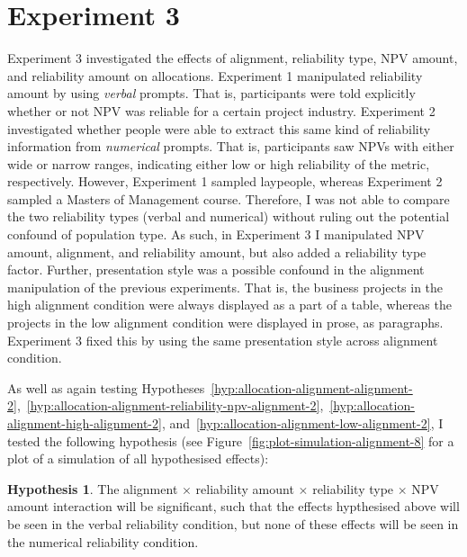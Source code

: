 \documentclass[a4paper, nobind, dvipsnames]{templates/ociamthesis}
\theoremstyle{definition}
\theoremstyle{definition}
\theoremstyle{definition}
\theoremstyle{definition}
\newtheorem{hypothesis}{Hypothesis}[chapter]
\theoremstyle{remark}
\begin{document}
\hypertarget{experiment-3}{%
\section{Experiment 3}\label{experiment-3}}

Experiment 3 investigated the effects of alignment, reliability type, NPV
amount, and reliability amount on allocations. Experiment 1 manipulated
reliability amount by using \emph{verbal} prompts. That is, participants were told
explicitly whether or not NPV was reliable for a certain project industry.
Experiment 2 investigated whether people were able to extract this same kind of
reliability information from \emph{numerical} prompts. That is, participants saw NPVs
with either wide or narrow ranges, indicating either low or high reliability of
the metric, respectively. However, Experiment 1 sampled laypeople, whereas
Experiment 2 sampled a Masters of Management course. Therefore, I was not able
to compare the two reliability types (verbal and numerical) without ruling out
the potential confound of population type. As such, in Experiment 3 I
manipulated NPV amount, alignment, and reliability amount, but also added a
reliability type factor. Further, presentation style was a possible confound in
the alignment manipulation of the previous experiments. That is, the business
projects in the high alignment condition were always displayed as a part of a
table, whereas the projects in the low alignment condition were displayed in
prose, as paragraphs. Experiment 3 fixed this by using the same presentation
style across alignment condition.

As well as again testing
Hypotheses~\ref{hyp:allocation-alignment-alignment-2},~\ref{hyp:allocation-alignment-reliability-npv-alignment-2},~\ref{hyp:allocation-alignment-high-alignment-2},
and~\ref{hyp:allocation-alignment-low-alignment-2}, I tested the following
hypothesis (see Figure~\ref{fig:plot-simulation-alignment-8} for a plot of a
simulation of all hypothesised effects):

\begin{hypothesis}
\protect\hypertarget{hyp:four-way-alignment-8}{}{\label{hyp:four-way-alignment-8} }The alignment \(\times\) reliability amount \(\times\) reliability type \(\times\) NPV
amount interaction will be significant, such that the effects hypthesised above
will be seen in the verbal reliability condition, but none of these effects
will be seen in the numerical reliability condition.
\end{hypothesis}
\end{document}
